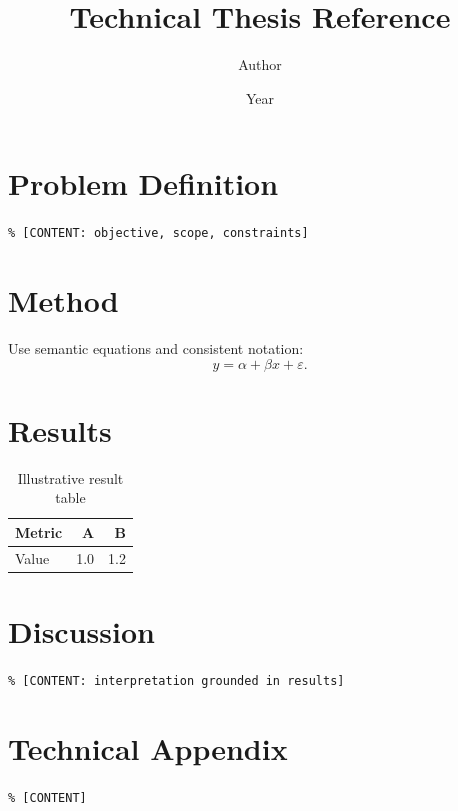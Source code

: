 \documentclass[11pt,a4paper]{scrreprt}
\begin{document}
\title{Technical Thesis Reference}\author{Author}\date{Year}\maketitle\tableofcontents
\chapter{Problem Definition}\texttt{\% [CONTENT: objective, scope, constraints]}
\chapter{Method}Use semantic equations and consistent notation:
\begin{equation} y = \alpha + \beta x + \varepsilon. \end{equation}
\chapter{Results}
\begin{table}[ht]\centering\caption{Illustrative result table}\begin{tabular}{lrr}\toprule Metric&A&B\\\midrule Value&1.0&1.2\\\bottomrule\end{tabular}\end{table}
\chapter{Discussion}\texttt{\% [CONTENT: interpretation grounded in results]}
\appendix\chapter{Technical Appendix}\texttt{\% [CONTENT]}
\end{document}
